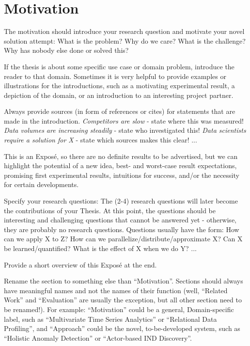 \section{Motivation}
\label{sec:motivation}

The motivation should introduce your research question and motivate your novel solution attempt: What is the problem? Why do we care? What is the challenge? Why has nobody else done or solved this?

If the thesis is about some specific use case or domain problem, introduce the reader to that domain. Sometimes it is very helpful to provide examples or illustrations for the introductions, such as a motivating experimental result, a depiction of the domain, or an introduction to an interesting project partner.

Always provide sources (in form of references or cites) for statements that are made in the introduction. \emph{Competitors are slow} - state where this was measured! \emph{Data volumes are increasing steadily} - state who investigated this! \emph{Data scientists require a solution for X} - state which sources makes this clear! ...

This is an Exposé, so there are no definite results to be advertised, but we can highlight the potential of a new idea, best- and worst-case result expectations, promising first experimental results, intuitions for success, and/or the necessity for certain developments.

Specify your research questions: The (2-4) research questions will later become the contributions of your Thesis. At this point, the questions should be interesting and challenging questions that cannot be answered yet - otherwise, they are probably no research questions. Questions usually have the form: How can we apply X to Z? How can we parallelize/distribute/approximate X? Can X be learned/quantified? What is the effect of X when we do Y? ...

Provide a short overview of this Exposé at the end.

Rename the section to something else than ``Motivation''. Sections should always have meaningful names and not the names of their function (well, ``Related Work'' and ``Evaluation'' are usually the exception, but all other section need to be renamed!). For example: ``Motivation'' could be a general, Domain-specific label, such as ``Multivariate Time Series Analytics'' or ``Relational Data Profiling'', and ``Approach'' could be the novel, to-be-developed system, such as ``Holistic Anomaly Detection'' or ``Actor-based IND Discovery''.
